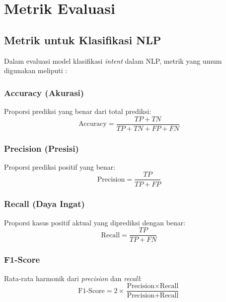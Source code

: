 \section{Metrik Evaluasi}

\subsection{Metrik untuk Klasifikasi NLP}

Dalam evaluasi model klasifikasi \textit{intent} dalam NLP, metrik yang umum digunakan meliputi \parencite{ali2020chatbot,perdana2025multi}:

\subsubsection{Accuracy (Akurasi)}
Proporsi prediksi yang benar dari total prediksi:
\begin{equation}
\text{Accuracy} = \frac{TP + TN}{TP + TN + FP + FN}
\end{equation}

\subsubsection{Precision (Presisi)}
Proporsi prediksi positif yang benar:
\begin{equation}
\text{Precision} = \frac{TP}{TP + FP}
\end{equation}

\subsubsection{Recall (Daya Ingat)}
Proporsi kasus positif aktual yang diprediksi dengan benar:
\begin{equation}
\text{Recall} = \frac{TP}{TP + FN}
\end{equation}

\subsubsection{F1-Score}
Rata-rata harmonik dari \textit{precision} dan \textit{recall}:
\begin{equation}
\text{F1-Score} = 2 \times \frac{\text{Precision} \times \text{Recall}}{\text{Precision} + \text{Recall}}
\end{equation}

